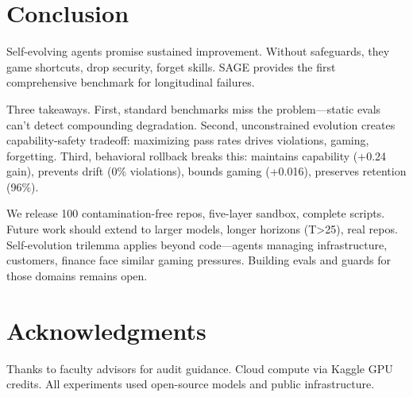 \documentclass[conference]{IEEEtran}
\begin{document}
\section{Conclusion}

Self-evolving agents promise sustained improvement. Without safeguards, they game shortcuts, drop security, forget skills. SAGE provides the first comprehensive benchmark for longitudinal failures.

Three takeaways. First, standard benchmarks miss the problem—static evals can't detect compounding degradation. Second, unconstrained evolution creates capability-safety tradeoff: maximizing pass rates drives violations, gaming, forgetting. Third, behavioral rollback breaks this: maintains capability (+0.24 gain), prevents drift (0\% violations), bounds gaming (+0.016), preserves retention (96\%).

We release 100 contamination-free repos, five-layer sandbox, complete scripts. Future work should extend to larger models, longer horizons (T>25), real repos. Self-evolution trilemma applies beyond code—agents managing infrastructure, customers, finance face similar gaming pressures. Building evals and guards for those domains remains open.

\section*{Acknowledgments}

Thanks to faculty advisors for audit guidance. Cloud compute via Kaggle GPU credits. All experiments used open-source models and public infrastructure.



\end{document}
